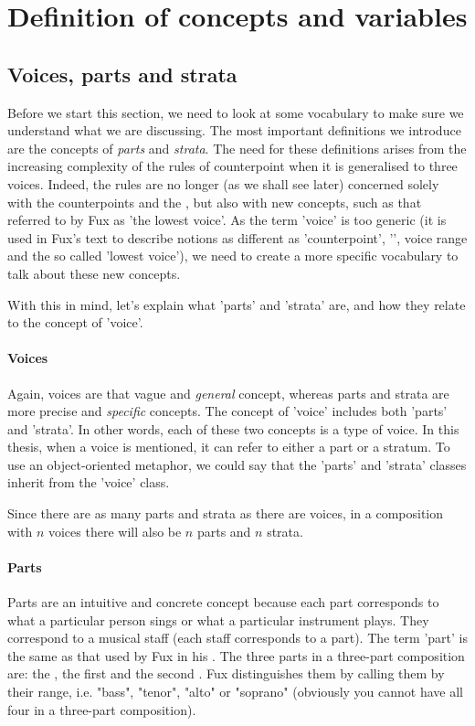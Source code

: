 \chapter{Definition of concepts and variables} \label{chapter:defining-some-concepts-and-redifing-the-variables}
\section{Voices, parts and strata}\label{section:parts-and-strata}
Before we start this section, we need to look at some vocabulary to make sure we understand what we are discussing. The most important definitions we introduce are the concepts of \textit{parts} and \textit{strata}. The need for these definitions arises from the increasing complexity of the rules of counterpoint when it is generalised to three voices. Indeed, the rules are no longer (as we shall see later) concerned solely with the counterpoints and the \cf, but also with new concepts, such as that referred to by Fux as 'the lowest voice'. As the term 'voice' is too generic (it is used in Fux's text to describe notions as different as 'counterpoint', '\cf', voice range and the so called 'lowest voice'), we need to create a more specific vocabulary to talk about these new concepts.

With this in mind, let's explain what 'parts' and 'strata' are, and how they relate to the concept of 'voice'.

\subsubsection{Voices} Again, voices are that vague and \textit{general} concept, whereas parts and strata are more precise and \textit{specific} concepts. The concept of 'voice' includes both 'parts' and 'strata'. In other words, each of these two concepts is a type of voice. In this thesis, when a voice is mentioned, it can refer to either a part or a stratum. To use an object-oriented metaphor, we could say that the 'parts' and 'strata' classes inherit from the 'voice' class.

Since there are as many parts and strata as there are voices, in a composition with $n$ voices there will also be $n$ parts and $n$ strata.

\subsubsection{Parts}
Parts are an intuitive and concrete concept because each part corresponds to what a particular person sings or what a particular instrument plays. They correspond to a musical staff (each staff corresponds to a part). The term 'part' is the same as that used by Fux in his \gap. The three parts in a three-part composition are: the \cf, the first \cps and the second \cp. Fux distinguishes them by calling them by their range, i.e. "bass", "tenor", "alto" or "soprano" (obviously you cannot have all four in a three-part composition).

